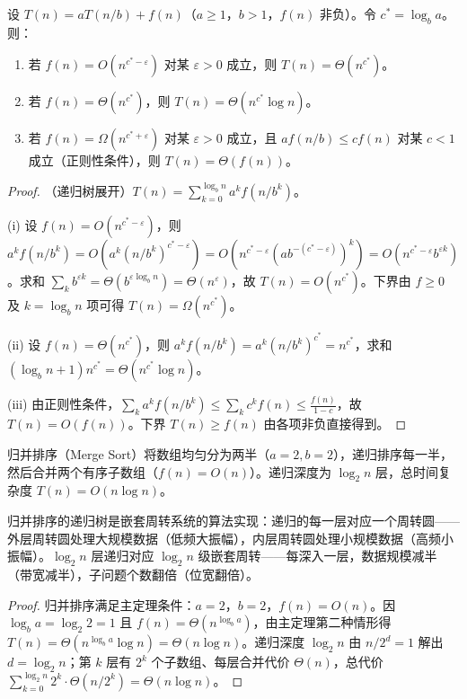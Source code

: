 \begin{theorem}[主定理]\label{thm:master_theorem}
设 $T(n) = a T(n/b) + f(n)$（$a \ge 1$，$b > 1$，$f(n)$ 非负）。令 $c^* = \log_b a$。则：
\begin{enumerate}[label=(\roman*)]
    \item 若 $f(n) = O(n^{c^*-\varepsilon})$ 对某 $\varepsilon > 0$ 成立，则 $T(n) = \Theta(n^{c^*})$。
    \item 若 $f(n) = \Theta(n^{c^*})$，则 $T(n) = \Theta(n^{c^*} \log n)$。
    \item 若 $f(n) = \Omega(n^{c^*+\varepsilon})$ 对某 $\varepsilon > 0$ 成立，且 $a f(n/b) \le c f(n)$ 对某 $c < 1$ 成立（正则性条件），则 $T(n) = \Theta(f(n))$。
\end{enumerate}
\end{theorem}

\begin{proof}
（递归树展开）$T(n) = \sum_{k=0}^{\log_b n} a^k f(n/b^k)$。

(i) 设 $f(n) = O(n^{c^*-\varepsilon})$，则 $a^k f(n/b^k) = O(a^k (n/b^k)^{c^*-\varepsilon}) = O(n^{c^*-\varepsilon} (a b^{-(c^*-\varepsilon)})^k) = O(n^{c^*-\varepsilon} b^{\varepsilon k})$。求和 $\sum_k b^{\varepsilon k} = \Theta(b^{\varepsilon \log_b n}) = \Theta(n^\varepsilon)$，故 $T(n) = O(n^{c^*})$。下界由 $f \ge 0$ 及 $k = \log_b n$ 项可得 $T(n) = \Omega(n^{c^*})$。

(ii) 设 $f(n) = \Theta(n^{c^*})$，则 $a^k f(n/b^k) = a^k (n/b^k)^{c^*} = n^{c^*}$，求和 $(\log_b n + 1) n^{c^*} = \Theta(n^{c^*} \log n)$。

(iii) 由正则性条件，$\sum_k a^k f(n/b^k) \le \sum_k c^k f(n) \le \frac{f(n)}{1-c}$，故 $T(n) = O(f(n))$。下界 $T(n)\ge f(n)$ 由各项非负直接得到。
\end{proof}

\begin{proposition}[归并排序的递归周期]\label{prop:mergesort_cycle}
归并排序（Merge Sort）将数组均匀分为两半（$a=2, b=2$），递归排序每一半，然后合并两个有序子数组（$f(n) = O(n)$）。递归深度为 $\log_2 n$ 层，总时间复杂度 $T(n) = O(n \log n)$。

归并排序的递归树是嵌套周转系统的算法实现：递归的每一层对应一个周转圆——外层周转圆处理大规模数据（低频大振幅），内层周转圆处理小规模数据（高频小振幅）。$\log_2 n$ 层递归对应 $\log_2 n$ 级嵌套周转——每深入一层，数据规模减半（带宽减半），子问题个数翻倍（位宽翻倍）。
\end{proposition}

\begin{proof}
归并排序满足主定理条件：$a = 2$，$b = 2$，$f(n) = O(n)$。因 $\log_b a = \log_2 2 = 1$ 且 $f(n) = \Theta(n^{\log_b a})$，由主定理第二种情形得 $T(n) = \Theta(n^{\log_b a}\log n) = \Theta(n\log n)$。递归深度 $\log_2 n$ 由 $n/2^d = 1$ 解出 $d = \log_2 n$；第 $k$ 层有 $2^k$ 个子数组、每层合并代价 $\Theta(n)$，总代价 $\sum_{k=0}^{\log_2 n} 2^k \cdot \Theta(n/2^k) = \Theta(n\log n)$。
\end{proof}


